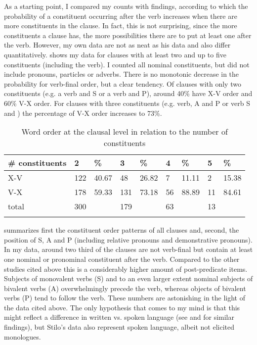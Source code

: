\documentclass[output=paper,colorlinks,citecolor=brown,draftmode]{langscibook}
\begin{document}
As a starting point, I compared my counts with  findings, according to which the probability of a constituent occurring after the verb increases when there are more constituents in the clause. In fact, this is not surprising, since the more constituents a clause has, the more possibilities there are to put at least one after the verb. However, my own data are not as neat as his data and also differ quantitatively.  shows my data for clauses with at least two and up to five constituents (including the verb). I counted all nominal constituents, but did not include pronouns, particles or adverbs. There is no monotonic decrease in the probability for verb-final order, but a clear tendency. Of clauses with only two constituents (e.g. a verb and S or a verb and P), around 40\% have X-V order and 60\% V-X order. For clauses with three constituents (e.g. verb, A and P or verb S and ) the percentage of V-X order increases to 73\%.

\begin{table}
 \begin{tabularx}{\textwidth}{lYYYYYYYY}
\lsptoprule
\# constituents & 2 & \% & 3 & \% & 4 & \% & 5 & \% \\
\midrule
X-V & 122 & 40.67 & 48 & 26.82 & 7 & 11.11 & 2 & 15.38 \\
V-X & 178 & 59.33 & 131 & 73.18 & 56 & 88.89 & 11 & 84.61 \\
\midrule
total & 300 & & 179 & & 63 & & 13 & \\
\lspbottomrule
 \end{tabularx}
 \caption{Word order at the clausal level in relation to the number of constituents}
 \label{EC:tab:1}
\end{table}

 summarizes first the constituent order patterns of all clauses and, second, the position of S, A and P (including relative pronouns and demonstrative pronouns). In my data, around two third of the clauses are not verb-final but contain at least one nominal or pronominal constituent after the verb. Compared to the other studies cited above this is a considerably higher amount of post-predicate items. Subjects of monovalent verbs (S) and to an even larger extent nominal subjects of bivalent verbs (A) overwhelmingly precede the verb, whereas objects of bivalent verbs (P) tend to follow the verb. These numbers are astonishing in the light of the data cited above. The only hypothesis that comes to my mind is that this might reflect a difference in written vs. spoken language (see  and  for similar findings), but Stilo's data also represent spoken language, albeit not elicited monologues.
\end{document}
